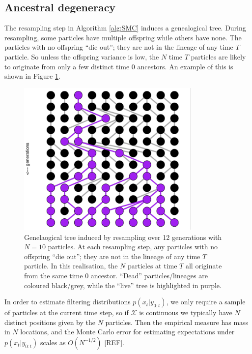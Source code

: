 \documentclass[fleqn]{article}
\theoremstyle{definition}
\begin{document}
\subsection{Ancestral degeneracy}
The resampling step in Algorithm \ref{alg:SMC} induces a genealogical tree.
During resampling, some particles have multiple offspring while others have none. The particles with no offspring ``die out''; they are not in the lineage of any time $T$ particle. So unless the offspring variance is low, the $N$ time $T$ particles are likely to originate from only a few distinct time $0$ ancestors.
An example of this is shown in Figure \ref{fig:WF_tree}.

\begin{figure}
\centering
\includegraphics[width=0.8\textwidth]{eg_WF.pdf}
\caption{Genelaogical tree induced by resampling over 12 generations with $N=10$ particles. At each resampling step, any particles with no offspring ``die out''; they are not in the lineage of any time $T$ particle. In this realisation, the $N$ particles at time $T$ all originate from the same time $0$ ancestor. ``Dead'' particles/lineages are coloured black/grey, while the ``live'' tree is highlighted in purple.}
\label{fig:WF_tree}
\end{figure}

In order to estimate filtering distributions $p(x_t | y_{0:t})$, we only require a sample of particles at the current time step, so if $\mathcal{X}$ is continuous we typically have $N$ distinct positions given by the $N$ particles. Then the empirical measure has mass in $N$ locations, and the Monte Carlo error for estimating expectations under $p(x_t | y_{0:t})$ scales as $O(N^{-1/2})$ [REF].
\end{document}
